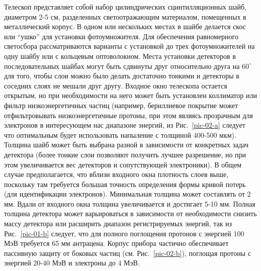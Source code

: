 \documentclass[12pt, a4paper, notitlepage, onecolumn]{article}
\begin{document}
Телескоп представляет собой набор цилиндрических сцинтилляционных шайб, диаметром 2-5 см, разделенных светоотражающим материалом, помещенных в металлический корпус. В одном или нескольких местах в шайбе делается скос или “ушко” для установки фотоумножителя. Для обеспечения равномерного светосбора рассматриваются варианты с установкой до трех фотоумножителей на одну шайбу или с кольцевым оптоволокном. Места установки детекторов в последовательных шайбах могут быть сдвинуты друг относительно друга на $60^\circ$ для того, чтобы слои можно было делать достаточно тонкими и детекторы в соседних слоях не мешали друг другу. Входное окно телескопа остается открытым, но при необходимости на него может быть установлен коллиматор или фильтр низкоэнергетичных частиц (например, бериллиевое покрытие может отфильтровывать низкоэнергетичные протоны, при этом являясь прозрачным для электронов в  интересующем нас диапазоне энергий, из Рис.~\ref{pic-02-a} следует что оптимальным будет использовать напыление с толщиной 400-500 мкм). Толщина шайб может быть выбрана разной в зависимости от конкретных задач детектора (более тонкие слои позволяют получить лучшее разрешение, но при этом увеличивается вес детекторов и сопутствующей электроники). В общем случае предполагается, что вблизи входного окна плотность слоев выше, поскольку там требуется большая точность определения формы кривой потерь (для идентификации электронов). Минимальная толщина может составлять от 2 мм. Вдали от входного окна толщина увеличивается и достигает 5-10 мм. Полная толщина детектора может варьироваться в зависимости от необходимости снизить массу детектора или расширить диапазон регистрируемых энергий, так из Рис.~\ref{pic-01-b} следует, что для полного поглощения протонов с энергией 100 МэВ требуется 65 мм антрацена. Корпус прибора частично обеспечивает пассивную защиту от боковых частиц (см. Рис.~\ref{pic-02-b}), поглощая протоны с энергией 20-40 МэВ и электроны до 4 МэВ.
\end{document}
